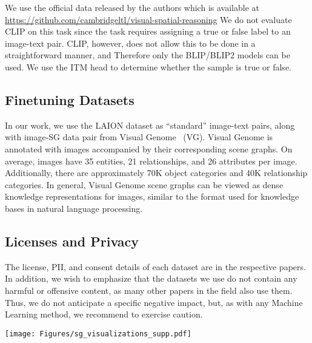 \documentclass[11pt]{article}
\newcommand{\minisection}[1]{\noindent{\textbf{#1}.}}
\begin{document}
\minisection{Inference details} We use the official data released by the authors which is available at \url{https://github.com/cambridgeltl/visual-spatial-reasoning} We do not evaluate CLIP on this task since the task requires assigning a true or false label to an image-text pair. CLIP, however, does not allow this to be done in a straightforward manner, and Therefore only the BLIP/BLIP2 models can be used. We use the ITM head to determine whether the sample is true or false.

\subsection{Finetuning Datasets}
\label{supp:datasets}

In our work, we use the LAION dataset as ``standard'' image-text pairs, along with image-SG data pair from Visual Genome~\cite{krishna2017visual} (VG). Visual Genome is annotated with  images accompanied by their corresponding scene graphs. On average, images have 35 entities, 21 relationships, and 26 attributes per image. Additionally, there are approximately 70K object categories and 40K relationship categories. In general, Visual Genome scene graphs can be viewed as dense knowledge representations for images, similar to the format used for knowledge bases in natural language processing.








\subsection{Licenses and Privacy}
\label{supp:datasets:Licenses}
The license, PII, and consent details of each dataset are in the respective papers. In addition, we wish to emphasize that the datasets we use do not contain any harmful or offensive content, as many other papers in the field also use them. Thus, we do not anticipate a specific negative impact, but, as with any Machine Learning method, we recommend to exercise caution. 













\begin{figure*}
\centering
    \texttt{[image: Figures/sg\_visualizations\_supp.pdf]}
    \label{supp:fig:sg_visualization}
\end{figure*}
\end{document}
